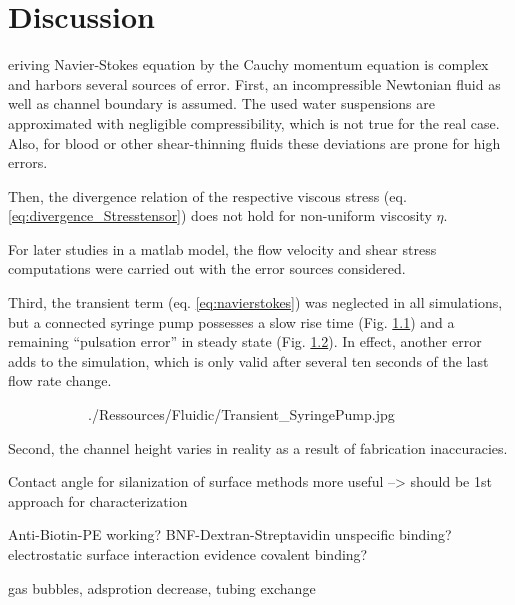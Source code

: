 \chapter{Discussion}
eriving Navier-Stokes equation by the Cauchy momentum equation is complex and harbors several sources of error. First, an incompressible Newtonian fluid as well as channel boundary is assumed. The used water suspensions are approximated with negligible compressibility, which is not true for the real case. Also, for blood or other shear-thinning fluids these deviations are prone for high errors.  

Then, the divergence relation of the respective viscous stress (eq. \ref{eq:divergence_Stresstensor}) does not hold for non-uniform viscosity $\eta$.

For later studies in a matlab model, the flow velocity and shear stress computations were carried out with the error sources considered. 


Third, the transient term (eq. \ref{eq:navierstokes}) was neglected in all simulations, but a connected syringe pump possesses a slow rise time (Fig. \ref{fig:fluidic:pumpStability:transient}) and a remaining ``pulsation error'' in steady state (Fig. \ref{fig:fluidic:pumpStability:steadystate}). In effect, another error adds to the simulation, which is only valid after several ten seconds of the last flow rate change.
\begin{figure}
	\begin{subfigure}[b]{0.5\textwidth}
		\centering
		\addtocounter{subfigure}{1}  
		 {./Ressources/Fluidic/Transient_SyringePump.jpg}		
		\addtocounter{subfigure}{-1}  
		\label{fig:fluidic:pumpStability:transient}
	\end{subfigure}%
	\begin{subfigure}[b]{0.5\textwidth}
		\centering
		\addtocounter{subfigure}{1}  
		\addtocounter{subfigure}{-1}  
		\label{fig:fluidic:pumpStability:steadystate}
	\end{subfigure}
	\label{fig:fluidic:pumpStability}
\end{figure}


Second, the channel height varies in reality as a result of fabrication inaccuracies. 

Contact angle for silanization of surface methods more useful --> should be 1st approach for characterization

Anti-Biotin-PE working?
BNF-Dextran-Streptavidin unspecific binding?
electrostatic surface interaction
evidence covalent binding?

gas bubbles, adsprotion decrease, tubing exchange